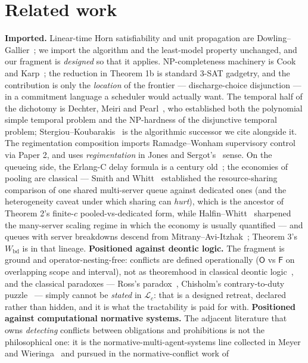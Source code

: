 \documentclass[11pt,a4paper]{article}
\newcommand{\Ob}{\mathsf{O}}
\newcommand{\Fb}{\mathsf{F}}
\begin{document}
\section{Related work}\label{sec:related}
\textbf{Imported.} Linear-time Horn satisfiability and unit propagation are Dowling--Gallier~\cite{dg84}; we import the algorithm
and the least-model property unchanged, and our fragment is \emph{designed} so that it applies. NP-completeness machinery is
Cook and Karp~\cite{cook71,karp72}; the reduction in Theorem 1b is standard 3-SAT gadgetry, and the contribution is only the
\emph{location} of the frontier --- discharge-choice disjunction --- in a commitment language a scheduler would actually want.
The temporal half of the dichotomy is Dechter, Meiri and Pearl~\cite{dmp91}, who established both the polynomial simple temporal
problem and the NP-hardness of the disjunctive temporal problem; Stergiou--Koubarakis~\cite{sk00} is the algorithmic successor we
cite alongside it. The regimentation composition imports Ramadge--Wonham supervisory control~\cite{rw87} via Paper 2, and uses
\emph{regimentation} in Jones and Sergot's~\cite{js93} sense. On the queueing side, the
Erlang-C delay formula is a century old~\cite{erlang17}; the economies of pooling are classical --- Smith and
Whitt~\cite{sw81} established the resource-sharing comparison of one shared multi-server queue against dedicated ones (and the
heterogeneity caveat under which sharing can \emph{hurt}), which is the ancestor of Theorem 2's finite-$c$ pooled-vs-dedicated
form, while Halfin--Whitt~\cite{hw81} sharpened the many-server scaling regime in which the economy is usually quantified ---
and queues with server breakdowns descend from Mitrany--Avi-Itzhak~\cite{ma68}; Theorem 3's
$W_{\mathrm{bd}}$ is in that lineage. \textbf{Positioned against deontic logic.} The fragment is ground and operator-nesting-free:
conflicts are defined operationally ($\Ob$ vs $\Fb$ on overlapping scope and interval), not as theoremhood in classical deontic
logic~\cite{vonwright51}, and the classical paradoxes --- Ross's paradox~\cite{ross41}, Chisholm's contrary-to-duty
puzzle~\cite{chisholm63} --- simply cannot be \emph{stated} in $\mathcal{L}_c$: that is a designed retreat, declared rather than
hidden, and it is what the tractability is paid for with. \textbf{Positioned against computational normative systems.} The
adjacent literature that owns \emph{detecting} conflicts between obligations and prohibitions is not the philosophical one: it is
the normative-multi-agent-systems line collected in Meyer and Wieringa~\cite{mw93} and pursued in the normative-conflict work of
\end{document}
